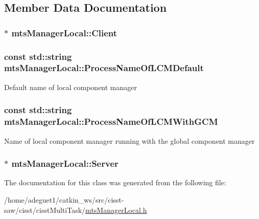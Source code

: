 \subsection{Member Data Documentation}
\hypertarget{classmts_manager_local_a0e669818ed71b1c33c114f082cc4094d}{
\subsubsection[{Client}]{$\ast$ mts\-Manager\-Local\-::\-Client}}\label{classmts_manager_local_a0e669818ed71b1c33c114f082cc4094d}
\hypertarget{classmts_manager_local_af1eb58312e2aae8668b7cdc00b211c31}{
\subsubsection[{Process\-Name\-Of\-L\-C\-M\-Default}]{\setlength{\rightskip}{0pt plus 5cm}const std\-::string mts\-Manager\-Local\-::\-Process\-Name\-Of\-L\-C\-M\-Default\hspace{0.3cm}{\ttfamily [static]}}}\label{classmts_manager_local_af1eb58312e2aae8668b7cdc00b211c31}
Default name of local component manager \hypertarget{classmts_manager_local_a4210fa8488468453764d5788f6c041a2}{
\subsubsection[{Process\-Name\-Of\-L\-C\-M\-With\-G\-C\-M}]{\setlength{\rightskip}{0pt plus 5cm}const std\-::string mts\-Manager\-Local\-::\-Process\-Name\-Of\-L\-C\-M\-With\-G\-C\-M\hspace{0.3cm}{\ttfamily [static]}}}\label{classmts_manager_local_a4210fa8488468453764d5788f6c041a2}
Name of local component manager running with the global component manager \hypertarget{classmts_manager_local_ab191b8b4a89a550336c9ce2273b5fd49}{
\subsubsection[{Server}]{$\ast$ mts\-Manager\-Local\-::\-Server}}\label{classmts_manager_local_ab191b8b4a89a550336c9ce2273b5fd49}


The documentation for this class was generated from the following file\-:\begin{DoxyCompactItemize}
\item 
/home/adeguet1/catkin\-\_\-ws/src/cisst-\/saw/cisst/cisst\-Multi\-Task/\hyperlink{mts_manager_local_8h}{mts\-Manager\-Local.\-h}\end{DoxyCompactItemize}
